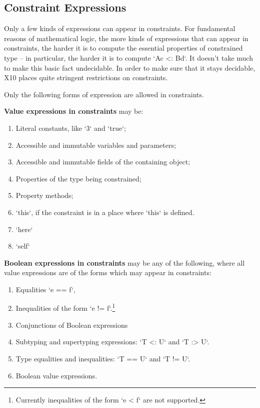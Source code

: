 {\begin{itemize}
\end{itemize}


\subsection{Constraint Expressions}




Only a few kinds of expressions can appear in constraints.  For fundamental
reasons of mathematical logic, the more kinds of expressions that can appear
in constraints, the harder it is to compute the essential properties of
constrained type -- in particular, the harder it is to compute 
\xcd`A{c} <: B{d}`.  It doesn't take much to make this basic fact undecidable.
In order to
make sure that it stays decidable, X10 places quite stringent restrictions on
constraints.  

Only the following forms of expression are allowed in constraints.  

{\bf Value expressions in constraints} may be: 
\begin{enumerate}
\item Literal constants, like \xcd`3` and \xcd`true`;
\item Accessible and immutable variables and parameters;
\item Accessible and immutable fields of the containing object;
\item Properties of the type being constrained;
\item Property methods;
\item \xcd`this`, if the constraint is in a place where \xcd`this` is defined.
\item \xcd`here`
\item \xcd`self`
\end{enumerate}


{\bf Boolean expressions in constraints} may be any of the following, where
all value expressions are of the forms which may appear in constraints: 
\begin{enumerate}
\item Equalities \xcd`e == f`,
\item Inequalities of the form \xcd`e != f`.\footnote{Currently inequalities
      of the form \xcd`e < f` are not supported.}
\item Conjunctions of Boolean expressions
\item Subtyping and supertyping expressions: \xcd`T <: U` and \xcd`T :> U`. 
\item Type equalities and inequalities: \xcd`T == U` and \xcd`T != U`.
\item Boolean value expressions.
\end{enumerate}

}
